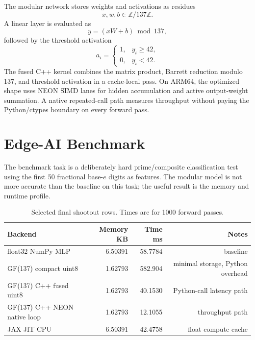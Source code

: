\documentclass[11pt]{article}
\begin{document}
The modular network stores weights and activations as residues
\begin{equation}
    x,w,b\in\mathbb{Z}/137\mathbb{Z}.
\end{equation}
A linear layer is evaluated as
\begin{equation}
    y = (xW+b)\bmod 137,
\end{equation}
followed by the threshold activation
\begin{equation}
    a_i =
    \begin{cases}
    1, & y_i\ge 42,\\
    0, & y_i<42.
    \end{cases}
\end{equation}
The fused C++ kernel combines the matrix product, Barrett reduction modulo
137, and threshold activation in a cache-local pass.  On ARM64, the optimized
shape uses NEON SIMD lanes for hidden accumulation and active output-weight
summation.  A native repeated-call path measures throughput without paying the
Python/ctypes boundary on every forward pass.

\section{Edge-AI Benchmark}

The benchmark task is a deliberately hard prime/composite classification test
using the first 50 fractional base-$e$ digits as features.  The modular model
is not more accurate than the baseline on this task; the useful result is the
memory and runtime profile.

\begin{table}[h]
\centering
\caption{Selected final shootout rows.  Times are for 1000 forward passes.}
\begin{tabular}{lrrr}
\toprule
Backend & Memory KB & Time ms & Notes \\
\midrule
float32 NumPy MLP & 6.50391 & 58.7784 & baseline \\
GF(137) compact uint8 & 1.62793 & 582.904 & minimal storage, Python overhead \\
GF(137) C++ fused uint8 & 1.62793 & 40.1530 & Python-call latency path \\
GF(137) C++ NEON native loop & 1.62793 & 12.1055 & throughput path \\
JAX JIT CPU & 6.50391 & 42.4758 & float compute cache \\
\bottomrule
\end{tabular}
\end{table}
\end{document}
